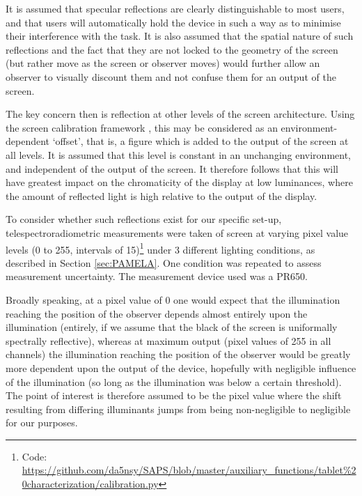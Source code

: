 It is assumed that specular reflections are clearly distinguishable to most users, and that users will automatically hold the device in such a way as to minimise their interference with the task. It is also assumed that the spatial nature of such reflections and the fact that they are not locked to the geometry of the screen (but rather move as the screen or observer moves) would further allow an observer to visually discount them and not confuse them for an output of the screen.

The key concern then is reflection at other levels of the screen architecture. Using the screen calibration framework \cite{berns_crt_1993}, this may be considered as an environment-dependent `offset', that is, a figure which is added to the output of the screen at all levels. It is assumed that this level is constant in an unchanging environment, and independent of the output of the screen. It therefore follows that this will have greatest impact on the chromaticity of the display at low luminances, where the amount of reflected light is high relative to the output of the display.

To consider whether such reflections exist for our specific set-up, telespectroradiometric measurements were taken of screen at varying pixel value levels (0 to 255, intervals of 15)\footnote{Code: \url{https://github.com/da5nsy/SAPS/blob/master/auxiliary_functions/tablet\%20characterization/calibration.py}} under 3 different lighting conditions, as described in Section \ref{sec:PAMELA}. One condition was repeated to assess measurement uncertainty. The measurement device used was a \gls{PR650}. 

Broadly speaking, at a pixel value of 0 one would expect that the illumination reaching the position of the observer depends almost entirely upon the illumination (entirely, if we assume that the black of the screen is uniformally spectrally reflective), whereas at maximum output (pixel values of 255 in all channels) the illumination reaching the position of the observer would be greatly more dependent upon the output of the device, hopefully with negligible influence of the illumination (so long as the illumination was below a certain threshold). The point of interest is therefore assumed to be the pixel value where the shift resulting from differing illuminants jumps from being non-negligible to negligible for our purposes.

